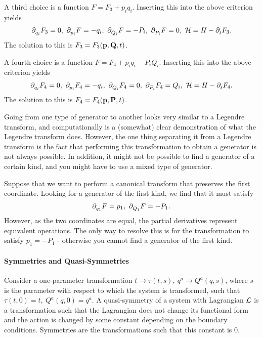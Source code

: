A third choice is a function $F = F_{3} + p_{i}q_{i}$. Inserting this into the above criterion yields
\begin{align*}
	\partial^{}_{q_{i}}F_{3} = 0,\ \partial^{}_{p_{i}}F = -q_{i},\ \partial^{}_{Q_{i}}F = -P_{i},\ \partial^{}_{P_{i}}F = 0,\ \mathcal{H} = H - \partial^{}_{t}F_{3}.
\end{align*}
The solution to this is $F_{3} = F_{3}(\vb{p}, \vb{Q}, t)$.

A fourth choice is a function $F = F_{4} + p_{i}q_{i} - P_{i}Q_{i}$. Inserting this into the above criterion yields
\begin{align*}
	\del{q_{i}}{F_{4}} = 0,\ \del{p_{i}}{F_{4}} = -q_{i},\ \del{Q_{i}}{F_{4}} = 0,\ \del{P_{i}}{F_{4}} = Q_{i},\ \ham = H - \del{t}{F_{4}}.
\end{align*}
The solution to this is $F_{4} = F_{4}(\vb{p}, \vb{P}, t)$.

Going from one type of generator to another looks very similar to a Legendre transform, and computationally is a (somewhat) clear demonstration of what the Legendre transform does. However, the one thing separating it from a Legendre transform is the fact that performing this transformation to obtain a generator is not always possible. In addition, it might not be possible to find a generator of a certain kind, and you might have to use a mixed type of generator.

Suppose that we want to perform a canonical transform that preserves the first coordinate. Looking for a generator of the first kind, we find that it must satisfy
\begin{align*}
	\partial^{}_{q_{1}}F = p_{1},\ \partial^{}_{Q_{1}}F = -P_{1}.
\end{align*}
However, as the two coordinates are equal, the partial derivatives represent equivalent operations. The only way to resolve this is for the transformation to satisfy $p_{1} = -P_{1}$ - otherwise you cannot find a generator of the first kind.

\paragraph{Symmetries and Quasi-Symmetries}
Consider a one-parameter transformation $t\to\tau(t, s),\ q^{a}\to Q^{a}(q, s)$, where $s$ is the parameter with respect to which the system is transformed, such that $\tau(t, 0) = t,\ Q^{a}(q, 0) = q^{a}$. A quasi-symmetry of a system with Lagrangian $\mathcal{L}$ is a transformation such that the Lagrangian does not change its functional form and the action is changed by some constant depending on the boundary conditions. Symmetries are the transformations such that this constant is $0$.

